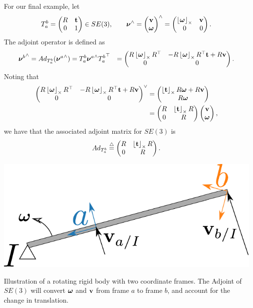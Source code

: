 For our final example, let 
\[
T_a^b = \begin{pmatrix} R & \mathbf{t} \\ 0 & 1\end{pmatrix} \in SE(3),  \qquad \boldsymbol{\nu}^\wedge = \begin{pmatrix} \mathbf{v} \\ \boldsymbol{\omega}\end{pmatrix}^\wedge = \begin{pmatrix} \left\lfloor\boldsymbol{\omega}\right\rfloor_{\times} & \mathbf{v} \\ 0 & 0 \end{pmatrix}.  
\]
The adjoint operator is defined as
\begin{align*}
{\boldsymbol{\nu}^b}^\wedge = Ad_{T_a^b}({\boldsymbol{\nu}^a}^\wedge) &= T_a^b {\boldsymbol{\nu}^a}^\wedge {T_a^b}^\top 
	&= \begin{pmatrix} R\left\lfloor\boldsymbol{\omega}\right\rfloor_{\times}R^\top & -R\left\lfloor\boldsymbol{\omega}\right\rfloor_{\times}R^\top \mathbf{t} + R\mathbf{v} \\ 0 & 0 \end{pmatrix}.
\end{align*}
Noting that
\begin{align*}
	\begin{pmatrix} R\left\lfloor\boldsymbol{\omega}\right\rfloor_{\times}R^\top & -R\left\lfloor\boldsymbol{\omega}\right\rfloor_{\times}R^\top \mathbf{t} + R\mathbf{v} \\ 0 & 0 \end{pmatrix}^\vee
	&= \begin{pmatrix} \left\lfloor\mathbf{t}\right\rfloor_{\times}R\boldsymbol{\omega} + R\mathbf{v} \\ R\boldsymbol{\omega} \end{pmatrix} \\
	&= \begin{pmatrix} R & \left\lfloor\mathbf{t}\right\rfloor_{\times} R \\ 0 & R \end{pmatrix}\begin{pmatrix}\mathbf{v} \\ \boldsymbol{\omega} \end{pmatrix}, 
\end{align*}
we have that the associated adjoint matrix for $SE(3)$ is
\[
Ad_{T_a^b} \stackrel{\triangle}{=} \begin{pmatrix} R & \left\lfloor\mathbf{t}\right\rfloor_{\times} R \\ 0 & R \end{pmatrix}.
\]

\begin{marginfigure}
\includegraphics[width=\linewidth]{chap2_preliminaries/figures/rotating_bar}
\caption{Illustration of a rotating rigid body with two coordinate frames.
The Adjoint of $SE(3)$ will convert $\boldsymbol{\omega}$
and $\mathbf{v}$ from frame $a$ to frame $b$, and account for the
change in translation. }
\label{fig:rotating_adjoint}
\end{marginfigure}

